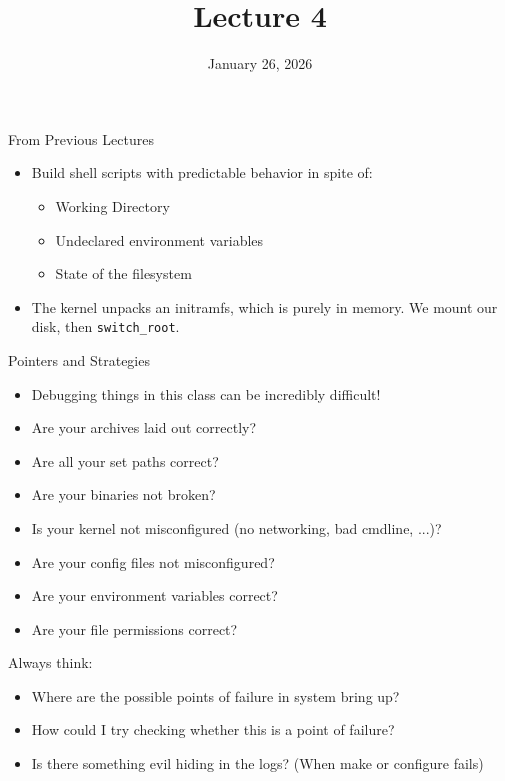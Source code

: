 \documentclass{../lecture}
\title{Lecture 4}
\date{January 26, 2026}
\begin{document}
\maketitle

\begin{frame}{From Previous Lectures}
  \begin{itemize}
    \item Build shell scripts with predictable behavior in spite of:
      \begin{itemize}
        \item Working Directory
        \item Undeclared environment variables
        \item State of the filesystem
      \end{itemize}
    \item The kernel unpacks an initramfs, which is purely in memory. We mount
      our disk, then \texttt{switch\_root}.
  \end{itemize}
\end{frame}

\begin{frame}{Pointers and Strategies}
  \begin{itemize}
    \item Debugging things in this class can be incredibly difficult!
    \item Are your archives laid out correctly?
    \item Are all your set paths correct?
    \item Are your binaries not broken?
    \item Is your kernel not misconfigured (no networking, bad cmdline, ...)?
    \item Are your config files not misconfigured?
    \item Are your environment variables correct?
    \item Are your file permissions correct?
  \end{itemize}
  Always think:
  \begin{itemize}
    \item Where are the possible points of failure in system bring up?
    \item How could I try checking whether this is a point of failure?
    \item Is there something evil hiding in the logs? (When make or configure
      fails)
  \end{itemize}
\end{frame}
\end{document}
